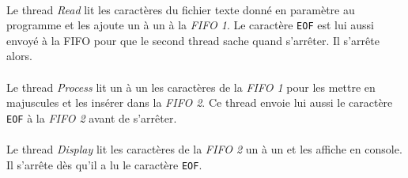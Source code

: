 \documentclass{article}
\begin{document}
    \paragraph{}
    Le thread \emph{Read} lit les caractères du fichier texte donné en paramètre au programme et les ajoute un à un à la \emph{FIFO 1}. Le caractère \texttt{EOF} est lui aussi envoyé à la FIFO pour que le second thread sache quand s'arrêter. Il s'arrête alors.
    
    \paragraph{}
    Le thread \emph{Process} lit un à un les caractères de la \emph{FIFO 1} pour les mettre en majuscules et les insérer dans la \emph{FIFO 2}. Ce thread envoie lui aussi le caractère \texttt{EOF} à la \emph{FIFO 2} avant de s'arrêter.

    \paragraph{}
    Le thread \emph{Display} lit les caractères de la \emph{FIFO 2} un à un et les affiche en console. Il s'arrête dès qu'il a lu le caractère \texttt{EOF}.
\end{document}
